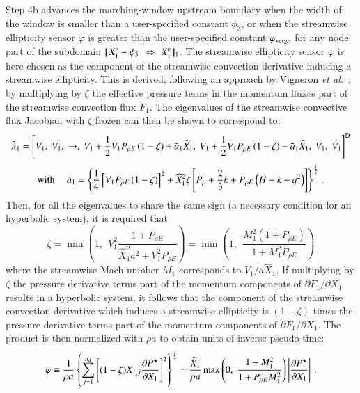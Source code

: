 \documentclass{warpdoc}
\newcommand{\nd}{{n_{\rm d}}}
\newcommand{\loope}{{\rm e}}
\newcommand{\varphiverge}{{\varphi_{\rm verge}}}
\newcommand{\bigfrac}{\displaystyle\frac}
\newcommand{\etal}{{\it et al.}~}
\newcommand\subdomain[3]{$ | \! | \, #2 $ $\Leftrightarrow$ $#3 \, | \! |_{#1}$}
\begin{document}
Step 4b advances the marching-window upstream boundary when the width
of the window is smaller than a user-specified constant $\phi_3$, or when
the streamwise ellipticity sensor $\varphi$ is greater than the user-specified
constant $\varphiverge$ for any node part of the subdomain
\subdomain{1}{X^{\loope}_1-\phi_3}{X^{\loope}_1}.
The streamwise ellipticity sensor $\varphi$ is here chosen as the component
of the streamwise convection derivative inducing a streamwise ellipticity.
This is derived, following an approach by Vigneron \etal \cite{aiaaconf:1978:vigneron},
by multiplying by $\zeta$ the effective pressure terms in the momentum fluxes
part of the streamwise convection flux $F_1$. The eigenvalues of the streamwise
convective flux Jacobian with $\zeta$ frozen can then be shown to correspond to:
%
\begin{displaymath}
 \tilde{\lambda}_1=
 \left[
   V_1,~
   V_1,~
   \rightarrow,~
   V_1 + \frac{1}{2} V_1 P_{\rho E} \left(1-\zeta\right)
       + \tilde{a}_1 \widehat{X}_1,~
   V_1 + \frac{1}{2} V_1 P_{\rho E} \left(1-\zeta\right)
       - \tilde{a}_1 \widehat{X}_1,~
   V_1,~
   V_1
 \right]^{\rm D} 
\end{displaymath}
%
%
\begin{displaymath}
  {\rm with ~~~~~}
  \tilde{a}_1=\left\{
    \frac{1}{4}\left[
       V_1 P_{\rho E} \left(1-\zeta\right)
    \right] ^2
    +\widehat{X}_1^2 \zeta \left[
       P_\rho+\frac{2}{3} k + P_{\rho E} \left(H-k-q^2\right)
    \right]
  \right\}^{\frac{1}{2}} \, .
\end{displaymath}
%
Then, for all the eigenvalues to share the same sign (a necessary condition
for an hyperbolic system), it is required that
%
\begin{equation}
  \zeta=\min\left(
    1,~~
    V_1^2 \frac{1+P_{\rho E}}{\widehat{X}_1^2 a^2+V_1^2 P_{\rho E}}
  \right)
  =\min\left(
    1,~~
    \frac{M_1^2(1+P_{\rho E})}{1+M_1^2 P_{\rho E}}
  \right)
\end{equation}
%
where the streamwise Mach number $M_1$ corresponds to $V_1/a\widehat{X}_1$.
If multiplying by $\zeta$ the pressure derivative terms part of the momentum
components of $\partial F_1 / \partial X_1$ results in a hyperbolic system,
it follows that the component of the streamwise convection derivative
which induces a streamwise ellipticity is $(1-\zeta)$ times the pressure derivative
terms part of the momentum components of $\partial F_1 / \partial X_1$.
The product is then normalized with $\rho a$ to obtain units of inverse pseudo-time:
%
\begin{equation}
  \varphi \equiv
      \bigfrac{1}{\rho a}
        \left\{ \sum_{j=1}^\nd
          \left[
            (1-\zeta) X_{1,j} \bigfrac{\partial P^\star}{\partial X_1}
          \right]^2
        \right\}^{\frac{1}{2}}
          =
      \bigfrac{\widehat{X}_1}{\rho a} \max \left( 0, ~ \bigfrac{1-M_1^2}{1+P_{\rho E} M_1^2} \right)
        \left| \bigfrac{\partial P^\star}{\partial X_1}\right| \, .
  \label{eqn:varphi}
\end{equation}
\end{document}
